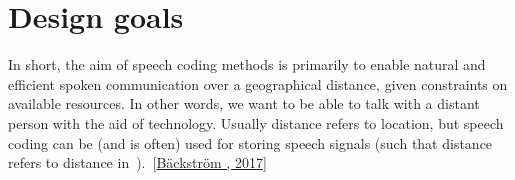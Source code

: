 \documentclass[letterpaper,10pt,english]{jupyterBook}
\begin{document}
\sphinxstepscope


\section{Design goals}
\label{\detokenize{Transmission/Design_goals:design-goals}}\label{\detokenize{Transmission/Design_goals::doc}}
\sphinxAtStartPar
In short, the aim of speech coding methods is primarily to enable
natural and efficient spoken communication over a geographical distance,
given constraints on available resources. In other words, we want to be
able to talk with a distant person with the aid of technology. Usually
distance refers to location, but speech coding can be (and is often)
used for storing speech signals (such that distance refers to distance
in ). {[}\hyperlink{cite.Transmission/Modified_discrete_cosine_transform_MDCT:id43}{Bäckström , 2017}{]}
\end{document}
